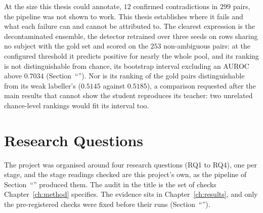 At the size this thesis could annotate, $12$ confirmed contradictions in $299$ pairs, the
pipeline was not shown to work. This thesis establishes where it fails and what each failure
can and cannot be attributed to. The clearest expression is the decontaminated ensemble, the
detector retrained over three seeds on rows sharing no subject with the gold set and scored on
the $253$ non-ambiguous pairs: at the configured threshold it predicts positive for nearly the
whole pool, and its ranking is not distinguishable from chance, its bootstrap interval
excluding an AUROC above $0.7034$ (Section~``''). Nor is its ranking of
the gold pairs distinguishable from its weak labeller's ($0.5145$ against $0.5185$), a
comparison requested after the main results that cannot show the student reproduces its
teacher: two unrelated chance-level rankings would fit its interval too.

\section{Research Questions}
\label{sec:intro-rqs}

The project was organised around four research questions (RQ1 to RQ4), one per stage, and the
stage readings checked are this project's own, as the pipeline of
Section~``'' produced them. The audit in the title is the set of
checks Chapter~\ref{ch:method} specifies. The evidence sits in Chapter~\ref{ch:results}, and
only the pre-registered checks were fixed before their runs
(Section~``'').

